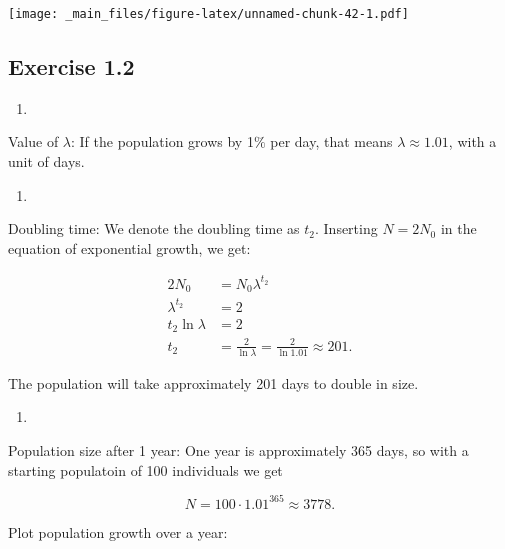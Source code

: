 \documentclass[
]{book}
\providecommand{\tightlist}{%
  \setlength{\itemsep}{0pt}\setlength{\parskip}{0pt}}
\begin{document}
\texttt{[image: \_main\_files/figure-latex/unnamed-chunk-42-1.pdf]}

\hypertarget{exercise-1.2-1}{%
\subsection*{Exercise 1.2}\label{exercise-1.2-1}}

\begin{enumerate}
\def\labelenumi{\arabic{enumi}.}
\tightlist
\item
\end{enumerate}

Value of \(\lambda\): If the population grows by 1\(\%\) per day, that means \(\lambda\approx 1.01\), with a unit of days.

\begin{enumerate}
\def\labelenumi{\arabic{enumi}.}
\setcounter{enumi}{1}
\tightlist
\item
\end{enumerate}

Doubling time: We denote the doubling time as \(t_2\). Inserting \(N=2N_0\) in the equation of exponential growth, we get:

\begin{align*}
2N_0&=N_0\lambda^{t_2}\\ 
\lambda^{t_2}&=2 \\ t_2\ln\lambda&=2\\ 
t_2&=\frac{2}{\ln\lambda} =\frac{2}{\ln 1.01} \approx 201.  
\end{align*}

The population will take approximately 201 days to double in size.

\begin{enumerate}
\def\labelenumi{\arabic{enumi}.}
\setcounter{enumi}{2}
\tightlist
\item
\end{enumerate}

Population size after 1 year: One year is approximately 365 days, so with a starting populatoin of 100 individuals we get

\[N=100\cdot 1.01^{365}\approx 3778.\]

Plot population growth over a year:
\end{document}
